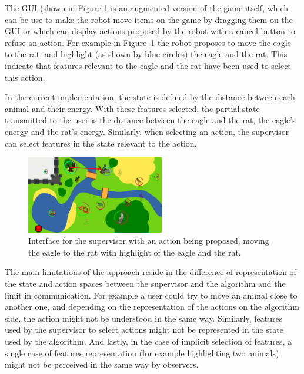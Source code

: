 \documentclass[letterpaper]{article} %
\begin{document}
The GUI (shown in Figure \ref{fig:gui} is an augmented
version of the game itself, which can be use to make the robot move items on the
game by dragging them on the GUI or which can display actions proposed by the
robot with a cancel button to refuse an action. For example in
Figure~\ref{fig:gui} the robot proposes to move the eagle to the rat, and
highlight (as shown by blue circles) the eagle and the rat. This indicate that
features relevant to the eagle and the rat have been used to select this action.

In the current implementation, the state is defined by the distance between each
animal and their energy. With these features selected, the partial state
transmitted to the user is the distance between the eagle and the rat, the
eagle's energy and
the rat's energy. Similarly, when selecting an action, the supervisor can 
select features in the state relevant to the action.

\begin{figure}
        \centering
    \includegraphics[width=60mm]{./figs/proposition.png}
    \caption{Interface for the supervisor with an action being proposed, moving
        the eagle to the rat with highlight of the eagle and the rat.}
        \label{fig:gui}
\end{figure}


The main limitations of the approach reside in the difference of
representation of the state and action spaces between the supervisor and the
algorithm and the limit in communication. For example a user could try to move
an animal close to another one,
and depending on the representation of the actions on the algorithm side, the
action might not be understood in the same way. Similarly, features used by the
supervisor to select actions might not be represented in the state used by the
algorithm. And lastly, in the case of implicit selection of features, a single
case of features representation (for example highlighting two animals) might not
be perceived in the same way by observers.
\end{document}
